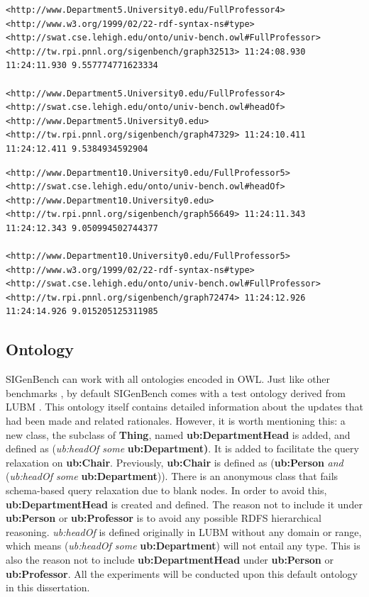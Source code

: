 \begin{lstlisting}[caption={Generated RDF Stream Example 2},basicstyle=\tiny,frame=single]
<http://www.Department5.University0.edu/FullProfessor4>
<http://www.w3.org/1999/02/22-rdf-syntax-ns#type>
<http://swat.cse.lehigh.edu/onto/univ-bench.owl#FullProfessor>
<http://tw.rpi.pnnl.org/sigenbench/graph32513> 11:24:08.930 11:24:11.930 9.557774771623334

<http://www.Department5.University0.edu/FullProfessor4>
<http://swat.cse.lehigh.edu/onto/univ-bench.owl#headOf>
<http://www.Department5.University0.edu>
<http://tw.rpi.pnnl.org/sigenbench/graph47329> 11:24:10.411 11:24:12.411 9.5384934592904
\end{lstlisting}

\begin{lstlisting}[caption={Generated RDF Stream Example 3},basicstyle=\tiny,frame=single]
<http://www.Department10.University0.edu/FullProfessor5>
<http://swat.cse.lehigh.edu/onto/univ-bench.owl#headOf>
<http://www.Department10.University0.edu>
<http://tw.rpi.pnnl.org/sigenbench/graph56649> 11:24:11.343 11:24:12.343 9.050994502744377

<http://www.Department10.University0.edu/FullProfessor5>
<http://www.w3.org/1999/02/22-rdf-syntax-ns#type>
<http://swat.cse.lehigh.edu/onto/univ-bench.owl#FullProfessor>
<http://tw.rpi.pnnl.org/sigenbench/graph72474> 11:24:12.926 11:24:14.926 9.015205125311985
\end{lstlisting}
%
\subsection{Ontology}
SIGenBench can work with all ontologies encoded in OWL.
Just like other benchmarks \cite{dell2013correctness} \cite{ali2015citybench}, by default SIGenBench comes with a test ontology derived from LUBM \cite{guo2005lubm}.
This ontology itself contains detailed information about the updates that had been made and related rationales. 
However, it is worth mentioning this: a new class, the subclass of \textbf{Thing}, named \textbf{ub:DepartmentHead} is added, and defined as (\textit{ub:headOf some} \textbf{ub:Department)}. 
It is added to facilitate the query relaxation on \textbf{ub:Chair}. 
Previously, \textbf{ub:Chair} is defined as (\textbf{ub:Person} \textit{and} (\textit{ub:headOf some} \textbf{ub:Department})). 
There is an anonymous class that fails schema-based query relaxation due to blank nodes. 
In order to avoid this, \textbf{ub:DepartmentHead} is created and defined.
The reason not to include it under \textbf{ub:Person} or \textbf{ub:Professor} is to avoid any possible RDFS hierarchical reasoning. 
\textit{ub:headOf} is defined originally in LUBM without any domain or range, which means (\textit{ub:headOf some} \textbf{ub:Department}) will not entail any type.
This is also the reason not to include \textbf{ub:DepartmentHead} under \textbf{ub:Person} or \textbf{ub:Professor}.
All the experiments will be conducted upon this default ontology in this dissertation.
%
